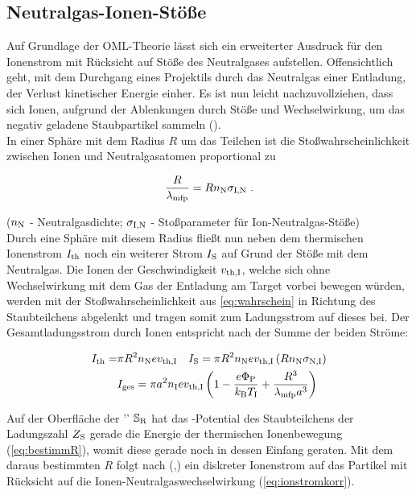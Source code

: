     \subsection{Neutralgas-Ionen-Stöße}

    Auf Grundlage der OML-Theorie lässt sich ein erweiterter Ausdruck für den Ionenstrom mit Rücksicht auf Stöße des Neutralgases aufstellen. Offensichtlich geht, mit dem Durchgang eines Projektils durch das Neutralgas einer Entladung, der Verlust kinetischer Energie einher. Es ist nun leicht nachzuvollziehen, dass sich Ionen, aufgrund der Ablenkungen durch Stöße und Wechselwirkung, um das negativ geladene Staubpartikel sammeln (\cite{Goree92}).\\
          In einer Sphäre mit dem Radius $R$ um das Teilchen ist die Stoßwahrscheinlichkeit zwischen Ionen und Neutralgasatomen proportional zu

      \begin{align}
        \frac{R}{\lambda_\text{mfp}}=Rn_\text{N}\sigma_\text{I,N} \,\, . \label{eq:wahrschein}
      \end{align}

    ($n_\text{N}$ - Neutralgasdichte; $\sigma_\text{I,N}$ - Stoßparameter für Ion-Neutralgas-Stöße)\\
    Durch eine Sph\"are mit diesem Radius flie{\ss}t nun neben dem thermischen Ionenstrom $I_\text{th}$ noch ein weiterer Strom $I_\text{S}$ auf Grund der St\"o{\ss}e mit dem Neutralgas. Die Ionen der Geschwindigkeit $v_\text{th,I}$, welche sich ohne Wechselwirkung mit dem Gas der Entladung am Target vorbei bewegen w\"urden, werden mit der Sto{\ss}wahrscheinlichkeit aus \autoref{eq:wahrschein} in Richtung des Staubteilchens abgelenkt und tragen somit zum Ladungsstrom auf dieses bei. Der Gesamtladungsstrom durch Ionen entspricht nach \cite{Lampe01} der Summe der beiden Str\"ome:

      \begin{align}
        I_\text{th}=&\pi R^{2}n_\text{N}ev_\text{th,I} \quad I_\text{S}=\pi R^2n_\text{N}ev_\text{th,I}\left(Rn_\text{N}\sigma_\text{N,I}\right) \\
        &I_\text{ges}=\pi a^{2}n_\text{I}ev_\text{th,I}\left(1-\frac{e\Phi_\text{P}}{k_\text{B}T_\text{I}}+\frac{R^{3}}{\lambda_\text{mfp}a^{3}}\right)
      \end{align}

    Auf der Oberfl\"ache der '' $\mathbb{S}_\text{R}$ hat das -Potential des Staubteilchens der Ladungszahl $Z_\text{S}$ gerade die Energie der thermischen Ionenbewegung (\autoref{eq:bestimmR}), womit diese gerade noch in dessen Einfang geraten. Mit dem daraus bestimmten $R$ folgt nach (\cite{Melzer12},\cite{Khrapak05a}) ein diskreter Ionenstrom auf das Partikel mit R\"ucksicht auf die Ionen-Neutralgaswechselwirkung (\autoref{eq:ionstromkorr}).

